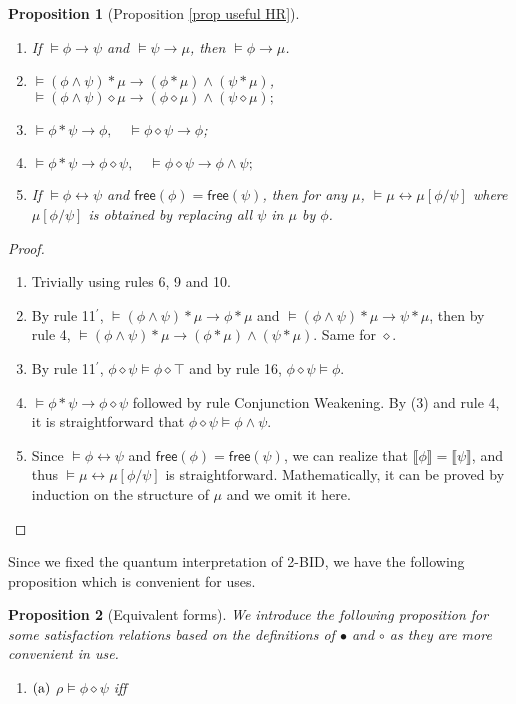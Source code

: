 \documentclass[conference,compsoc, 10pt]{IEEEtran}
\newtheorem{proposition}{Proposition}[section]
\newcommand {\Lfree }[1] {{\mathsf{free}{\left(#1\right)}}}
\newcommand {\sem}[1] {\llbracket#1\rrbracket}
\newcommand{\sd}{\diamond}%
\begin{document}
\begin{appendices}
		\begin{proposition}[Proposition \ref{prop useful HR}]
			\begin{enumerate}
				\item If $\models\phi\rightarrow\psi$ and $\models\psi\rightarrow\mu$, then $\models\phi\rightarrow\mu$.
				\item $\models (\phi\wedge\psi)\ast\mu\rightarrow(\phi\ast\mu)\wedge(\psi\ast\mu)$, \quad
				$\models (\phi\wedge\psi)\sd\mu\rightarrow(\phi\sd\mu)\wedge(\psi\sd\mu);$
				\item $\models \phi\ast\psi\rightarrow\phi, \quad \models \phi\sd\psi\rightarrow\phi$;
				\item $\models \phi\ast\psi\rightarrow\phi\sd\psi, \quad \models \phi\sd\psi\rightarrow\phi\wedge\psi;$
				\item If $\models\phi\leftrightarrow\psi$ and $\Lfree{\phi} = \Lfree{\psi}$, then for any $\mu$, $\models\mu\leftrightarrow\mu[\phi/\psi]$ where $\mu[\phi/\psi]$ is obtained by replacing all $\psi$ in $\mu$ by $\phi$.
			\end{enumerate}
		\end{proposition}
		\begin{proof}	
			\begin{enumerate}
				\item Trivially using rules 6, 9 and 10.
				\item By rule 11$^\prime$, $\models(\phi\wedge\psi)\ast\mu\rightarrow\phi\ast\mu$ and $\models(\phi\wedge\psi)\ast\mu\rightarrow\psi\ast\mu$, then by rule 4, $\models(\phi\wedge\psi)\ast\mu\rightarrow(\phi\ast\mu)\wedge(\psi\ast\mu)$. Same for $\sd$.
				\item By rule 11$^\prime$,  $\phi\sd\psi\models\phi\sd\top$ and by rule 16, $\phi\sd\psi\models\phi$.
				\item $\models \phi\ast\psi\rightarrow\phi\sd\psi$ followed by rule Conjunction Weakening.  By (3) and rule 4, it is straightforward that $\phi\sd\psi\models\phi\wedge\psi$.
				\item Since $\models\phi\leftrightarrow\psi$ and $\Lfree{\phi} = \Lfree{\psi}$, we can realize that $\sem{\phi} = \sem{\psi}$, and thus $\models\mu\leftrightarrow\mu[\phi/\psi]$ is straightforward. Mathematically, it can be proved by induction on the structure of $\mu$ and we omit it here.
			\end{enumerate}
		\end{proof}
		
		Since we fixed the quantum interpretation of 2-BID, we have the following proposition which is convenient for uses.
		\begin{proposition}[Equivalent forms]
			\label{prop alt form} 
			We introduce the following proposition for some satisfaction relations based on the definitions of $\bullet$ and $\circ$ as they are more convenient in use.
			\begin{enumerate}
				\item[${\rm 1.}$] ${\rm (a)}$ $\rho\models\phi\sd\psi$ iff 
				

\end{enumerate}
\end{proposition}
\end{appendices}
\end{document}

